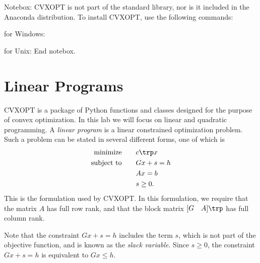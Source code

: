 \label{lab:Optimization 2}

Notebox: CVXOPT is not part of the standard library, nor is it included in the Anaconda distribution. To install CVXOPT, use the following commands:

for Windows: 

for Unix: 
End notebox.

\section*{Linear Programs}

CVXOPT is a package of Python functions and classes designed for the purpose of convex optimization.
In this lab we will focus on linear and quadratic programming.
A \emph{linear program} is a linear constrained optimization problem. Such a problem can be stated in several
different forms, one of which is
\begin{align*}
\text{minimize}\qquad &c\trp x \\
\text{subject to}\qquad &Gx + s = h\\
&Ax = b \\
 &s \geq 0.
\end{align*}
This is the formulation used by CVXOPT.
In this formulation, we require that the matrix $A$ has full row rank,
and that the block matrix $[G \quad A]\trp $ has full column rank.

Note that the constraint $Gx +s = h$ includes the term $s$, which is not part of the objective
function, and is known as the \emph{slack variable}. Since $s  \geq 0$, the constraint
$Gx + s = h$ is equivalent to $Gx \leq h$.

\begin{comment}
The corresponding \emph{dual program} for the above linear program has the form
\begin{align*}
\text{maximize}\qquad &-h\trp z - b\trp y \\
\text{subject to}\qquad &G\trp z + A\trp y + c = 0\\
 &z \geq 0.
\end{align*}
CVXOPT provides functions to solve both the original (\emph{primal}) linear program and its dual program.
\end{comment}

